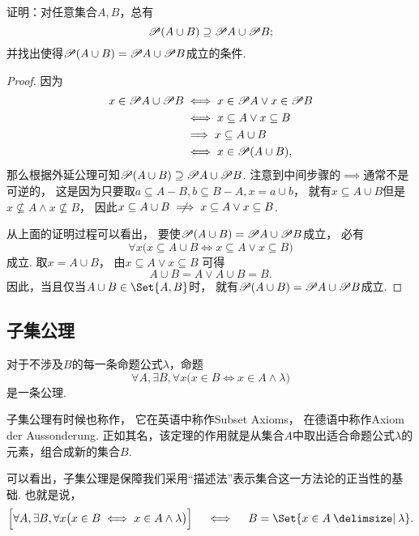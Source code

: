 \begin{example}
证明：对任意集合\(A,B\)，总有
\begin{equation}
	\mathscr{P} (A \cup B) \supseteq \mathscr{P} A \cup \mathscr{P} B;
\end{equation}
并找出使得\(\mathscr{P} (A \cup B) = \mathscr{P} A \cup \mathscr{P} B\)成立的条件.
\begin{proof}
因为\begin{align*}
	x \in \mathscr{P} A \cup \mathscr{P} B
	&\iff x \in \mathscr{P} A \lor x \in \mathscr{P} B \\
	&\iff x \subseteq A \lor x \subseteq B \\
	&\implies x \subseteq A \cup B \\
	&\iff x \in \mathscr{P} (A \cup B),
\end{align*}
那么根据外延公理可知\(\mathscr{P} (A \cup B) \supseteq \mathscr{P} A \cup \mathscr{P} B\).
注意到中间步骤的\(\implies\)通常不是可逆的，
这是因为只要取\(a \subseteq A - B, b \subseteq B - A, x = a \cup b\)，
就有\(x \subseteq A \cup B\)但是\(x \not\subseteq A \land x \not\subseteq B\)，
因此\(x \subseteq A \cup B \notimplies x \subseteq A \lor x \subseteq B\).

从上面的证明过程可以看出，
要使\(\mathscr{P} (A \cup B) = \mathscr{P} A \cup \mathscr{P} B\)成立，
必有\[
	\forall x \bigl(
		x \subseteq A \cup B
		\iff
		x \subseteq A \lor x \subseteq B
	\bigr)
\]成立.
取\(x = A \cup B\)，
由\(x \subseteq A \lor x \subseteq B\)
可得\[
	A \cup B = A \lor A \cup B = B.
\]
因此，当且仅当\(A \cup B \in \Set{A,B}\)时，
就有\(\mathscr{P} (A \cup B) = \mathscr{P} A \cup \mathscr{P} B\)成立.
\end{proof}
\end{example}

\subsection{子集公理}
\begin{axiom}[子集公理]
对于不涉及\(B\)的每一条命题公式\(\lambda\)，命题\[
	\forall A, \exists B, \forall x \bigl(
		x \in B \iff x \in A \land \lambda
	\bigr)
\]是一条公理.
\end{axiom}
子集公理有时候也称作，%
它在英语中称作Subset Axioms，%
在德语中称作Axiom der Aussonderung.
正如其名，该定理的作用就是从集合\(A\)中取出适合命题公式\(\lambda\)的元素，组合成新的集合\(B\).

可以看出，子集公理是保障我们采用“描述法”表示集合这一方法论的正当性的基础.
也就是说，\[
\Bigl[
	\forall A, \exists B, \forall x \bigl(
		x \in B \iff x \in A \land \lambda
	\bigr)
\Bigr]
\quad\iff\quad
B = \Set{ x \in A \given \lambda }.
\]

